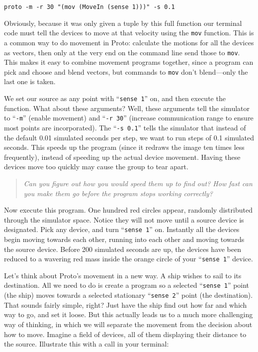 \documentclass{article}
\newcommand\code[1]{\begin{center}\var{#1}\end{center}}
\newcommand\problem[1]{\begin{quote}{\em #1}\end{quote}}
\newcommand\var[1]{{\tt #1}}
\newcommand\qvar[1]{``{\tt #1}''}
\begin{document}
\code{proto -m -r 30 "(mov (MoveIn (sense 1)))" -s 0.1}

Obviously, because it was only given a tuple by this full function
our terminal code must tell the devices to move at that velocity using
the \var{mov} function.  This is a common way to do movement in Proto:
calculate the motions for all the devices as vectors, then only at the
very end on the command line send those to \var{mov}.  This makes it
easy to combine movement programs together, since a program can pick
and choose and blend vectors, but commands to \var{mov} don't
blend---only the last one is taken.

We set our source as any point with \qvar{sense 1} on, and then
execute the function.  What about these arguments?  Well, these
arguments tell the simulator to \qvar{-m} (enable movement) and
\qvar{-r 30} (increase communication range to ensure most points are
incorporated).  The \qvar{-s 0.1} tells the simulator that instead of
the default 0.01 simulated seconds per step, we want to run steps of
0.1 simulated seconds.  This speeds up the program (since it redraws
the image ten times less frequently), instead of speeding up the
actual device movement.  Having these devices move too quickly may
cause the group to tear apart. 

\problem{Can you figure out how you would speed them up to find out?
  How fast can you make them go before the program stops working
  correctly?}

Now execute this program.  One hundred red circles appear, randomly
distributed through the simulator space.  Notice they will not move
until a source device is designated.  Pick
any device, and turn \qvar{sense 1} on.  Instantly all the devices
begin moving towards each other, running into each other and moving
towards the source device.  Before 200 simulated seconds are up, the
devices have been reduced to a wavering red mass inside the orange
circle of your \qvar{sense 1} device.

Let's think about Proto's movement in a new way.  A ship wishes to
sail to its destination.  All we need to do is create a program so a
selected \qvar{sense 1} point (the ship) moves towards a selected
stationary \qvar{sense 2} point (the destination).  That sounds fairly
simple, right?  Just have the ship find out how far and which way to
go, and set it loose.  But this actually leads us to a much more
challenging way of thinking, in which we will separate the movement
from the decision about how to move.  Imagine a field of devices, all
of them displaying their distance to the source.  Illustrate this with
a call in your terminal:
\end{document}
